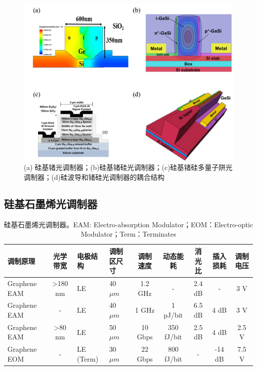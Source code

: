 \begin{figure}[htb]
	\centering
	\includegraphics[width=12cm]{./Pictures/fig_ge_mod.jpg}
	\caption{ (a) 硅基锗光调制器\cite{Srinivasan201656}；(b)硅基锗硅光调制器\cite{Dazeng2013high}；(c)硅基锗硅多量子阱光调制器\cite{chaisakul201223}；(d)硅波导和锗硅光调制器的耦合结构\cite{Dazeng2013high}}
	\label{fig_ge_mod}
\end{figure}
\subsection{硅基石墨烯光调制器}
{
	\begin{table}[htb]
		\caption{硅基石墨烯光调制器。EAM: Electro-absorption Modulator；EOM：Electro-optic Modulator；Term：Terminates}
		\label{sil_graphene_mod}
		\centering
		\begin{tabular}[t]{p{1.5cm}cp{0.8cm}p{1.2cm}ccccc}
			\hline
			调制原理 & 光学带宽 & 电极结构 & 调制区尺寸 & 调制速度 & 动态能耗 & 消光比 & 插入损耗 & 调制电压\\
			\hline
			Graphene EAM\cite{liu2011graphene} & >180 nm & LE  & 40 $\mu m$ & 1.2 GHz & - & 2.4 dB & - & 3 V\\
			Graphene EAM\cite{liu2012double} & -  & LE  & 40 $\mu m$ & 1 GHz & 1 pJ/bit & 6.5 dB & 4 dB & 3 V\\
			Graphene EAM\cite{hu2014broadband} & >80 nm & LE  & 50 $\mu m$ & 10 Gbps & 350 fJ/bit & 2.5 dB & 4 dB& 2.5 V\\
			Graphene EOM\cite{phare2015graphene} & - & LE (Term) & 30 $\mu m$ & 22 Gbps & 800 fJ/bit & - & -14 dB & 7.5 V\\
			\hline
		\end{tabular}
	\end{table}
}

